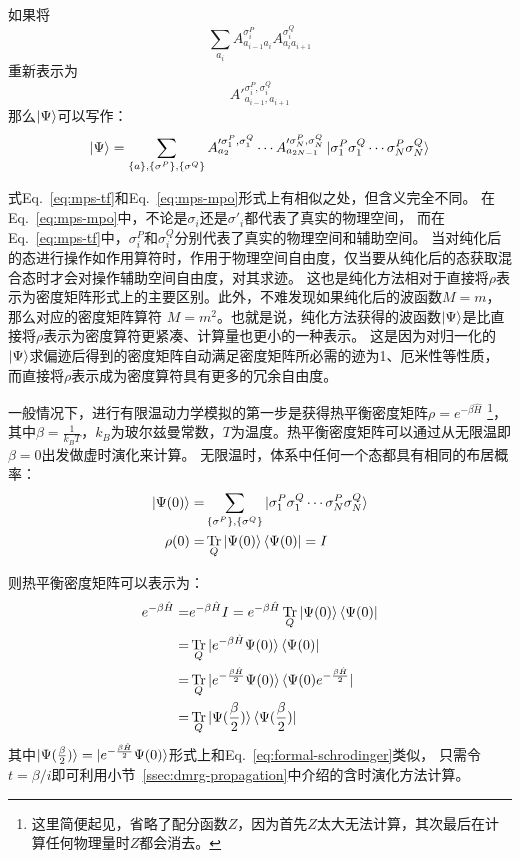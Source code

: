 \documentclass{article}
\DeclareMathOperator{\Tr}{Tr}
\begin{document}
如果将
$$
\sum_{a_i} A^{\sigma_i^P}_{a_{i-1}a_{i}} A^{\sigma_i^Q}_{a_{i}a_{i+1}}
$$
重新表示为
$$
A'^{\sigma_i^P, \sigma_i^Q}_{a_{i-1}, a_{i+1}}
$$
那么$\ket{\Psi}$可以写作：
\begin{equation}
\label{eq:mps-tf}
    \ket{\Psi} = 
    \sum_{\{a\},\{\sigma^P\},\{\sigma^Q\}}
     A'^{\sigma^P_1, \sigma^Q_1}_{a_2}  \cdots
                    A'^{\sigma^P_N, \sigma^Q_N}_{a_{2N-1}} 
    \ket{ \sigma^P_1\sigma^Q_1 \cdots \sigma^P_N \sigma^Q_N}
\end{equation}

式Eq.~\ref{eq:mps-tf}和Eq.~\ref{eq:mps-mpo}形式上有相似之处，但含义完全不同。
在Eq.~\ref{eq:mps-mpo}中，不论是$\sigma_i$还是$\sigma'_i$都代表了真实的物理空间，
而在Eq.~\ref{eq:mps-tf}中，$\sigma^P_i$和$\sigma^Q_i$分别代表了真实的物理空间和辅助空间。
当对纯化后的态进行操作如作用算符时，作用于物理空间自由度，仅当要从纯化后的态获取混合态时才会对操作辅助空间自由度，对其求迹。
这也是纯化方法相对于直接将$\rho$表示为密度矩阵形式上的主要区别。此外，不难发现如果纯化后的波函数$M=m$，那么对应的密度矩阵算符
$M=m^2$。也就是说，纯化方法获得的波函数$\ket{\Psi}$是比直接将$\rho$表示为密度算符更紧凑、计算量也更小的一种表示。
这是因为对归一化的$\ket{\Psi}$求偏迹后得到的密度矩阵自动满足密度矩阵所必需的迹为1、厄米性等性质，
而直接将$\rho$表示成为密度算符具有更多的冗余自由度。

一般情况下，进行有限温动力学模拟的第一步是获得热平衡密度矩阵$\rho = e^{-\beta \hat H}$
\footnote{这里简便起见，省略了配分函数$Z$，因为首先$Z$太大无法计算，其次最后在计算任何物理量时$Z$都会消去。}，
其中$\beta=\frac{1}{k_B T}$，$k_B$为玻尔兹曼常数，$T$为温度。热平衡密度矩阵可以通过从无限温即$\beta=0$出发做虚时演化来计算。
无限温时，体系中任何一个态都具有相同的布居概率：
\begin{equation}
\begin{aligned}
    \ket{\Psi(0)} = &
    \sum_{\{\sigma^P\},\{\sigma^Q\}}
    \ket{ \sigma^P_1\sigma^Q_1 \cdots \sigma^P_N \sigma^Q_N}       \\
    \rho(0) = & \Tr_Q \ket{\Psi(0)} \bra{\Psi(0)} = I
\end{aligned}
\end{equation}

则热平衡密度矩阵可以表示为：
\begin{equation}
\label{eq:imag-propagation}
\begin{aligned}
    e^{-\beta \hat H} = & e^{-\beta \hat H} I = e^{-\beta \hat H} \Tr_Q \ket{\Psi(0)} \bra{\Psi(0)} \\
    = & \Tr_Q \ket{e^{-\beta \hat H} \Psi(0)} \bra{\Psi(0)}  \\
    = & \Tr_Q \ket{e^{-\frac{\beta \hat H}{2}} \Psi(0)} \bra{\Psi(0)e^{-\frac{\beta \hat H}{2}}} \\
    = & \Tr_Q \ket{\Psi(\frac{\beta}{2})} \bra{\Psi(\frac{\beta}{2})}
\end{aligned}
\end{equation}
其中$\ket{\Psi(\frac{\beta}{2})} = \ket{e^{-\frac{\beta \hat H}{2}} \Psi(0)}$形式上和Eq.~\ref{eq:formal-schrodinger}类似，
只需令$t=\beta / i$即可利用小节~\ref{ssec:dmrg-propagation}中介绍的含时演化方法计算。
\end{document}
